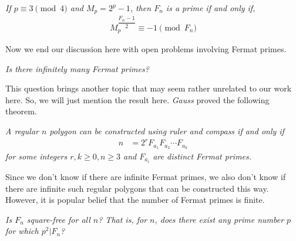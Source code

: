 \documentclass{subfile}
\begin{document}
		\begin{theorem}\slshape
			If $p\equiv3\pmod4$ and $M_p=2^p-1$, then $F_n$ is a prime if and only if,
				\begin{align*}
					M_p^{\dfrac{F_n-1}{2}}\equiv-1\pmod{F_n}
				\end{align*}
		\end{theorem}
	Now we end our discussion here with open problems involving Fermat primes.
		\begin{open}\slshape
			Is there infinitely many Fermat primes?
		\end{open}
	This question brings another topic that may seem rather unrelated to our work here. So, we will just mention the result here. \textit{Gauss} proved the following theorem.
		\begin{theorem}[Gauss]\slshape
			A regular $n$ polygon can be constructed using ruler and compass if and only if 
				\begin{align*}
					n & = 2^rF_{a_1}F_{a_2}\cdots F_{a_k}
				\end{align*}
			for some integers $r,k\geq0,n\geq3$ and $F_{a_i}$ are distinct Fermat primes.
		\end{theorem}
	Since we don't know if there are infinite Fermat primes, we also don't know if there are infinite such regular polygons that can be constructed this way. However, it is popular belief that the number of Fermat primes is finite.
		\begin{open}\slshape
			Is $F_n$ square-free for all $n$? That is, for $n$, does there exist any prime number $p$ for which $p^2|F_n$?
		\end{open}
	
\end{document}
